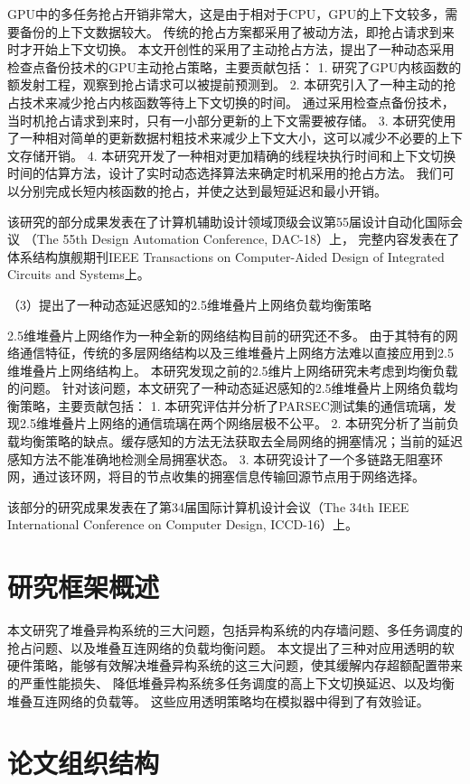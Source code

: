 GPU中的多任务抢占开销非常大，这是由于相对于CPU，GPU的上下文较多，需要备份的上下文数据较大。
传统的抢占方案都采用了被动方法，即抢占请求到来时才开始上下文切换。
本文开创性的采用了主动抢占方法，提出了一种动态采用检查点备份技术的GPU主动抢占策略，主要贡献包括：
1. 研究了GPU内核函数的额发射工程，观察到抢占请求可以被提前预测到。
2. 本研究引入了一种主动的抢占技术来减少抢占内核函数等待上下文切换的时间。
通过采用检查点备份技术，当时机抢占请求到来时，只有一小部分更新的上下文需要被存储。
3. 本研究使用了一种相对简单的更新数据村粗技术来减少上下文大小，这可以减少不必要的上下文存储开销。
4. 本研究开发了一种相对更加精确的线程块执行时间和上下文切换时间的估算方法，设计了实时动态选择算法来确定时机采用的抢占方法。
我们可以分别完成长短内核函数的抢占，并使之达到最短延迟和最小开销。

该研究的部分成果发表在了计算机辅助设计领域顶级会议第55届设计自动化国际会议
（The 55th Design Automation Conference, DAC-18）上，
完整内容发表在了体系结构旗舰期刊IEEE Transactions on Computer-Aided Design of Integrated Circuits and Systems上。 

（3）提出了一种动态延迟感知的2.5维堆叠片上网络负载均衡策略

2.5维堆叠片上网络作为一种全新的网络结构目前的研究还不多。
由于其特有的网络通信特征，传统的多层网络结构以及三维堆叠片上网络方法难以直接应用到2.5维堆叠片上网络结构上。
本研究发现之前的2.5维片上网络研究未考虑到均衡负载的问题。
针对该问题，本文研究了一种动态延迟感知的2.5维堆叠片上网络负载均衡策略，主要贡献包括：
1. 本研究评估并分析了PARSEC测试集的通信琉璃，发现2.5维堆叠片上网络的通信琉璃在两个网络层极不公平。
2. 本研究分析了当前负载均衡策略的缺点。缓存感知的方法无法获取去全局网络的拥塞情况；当前的延迟感知方法不能准确地检测全局拥塞状态。
3. 本研究设计了一个多链路无阻塞环网，通过该环网，将目的节点收集的拥塞信息传输回源节点用于网络选择。

该部分的研究成果发表在了第34届国际计算机设计会议（The 34th IEEE International Conference on Computer Design, ICCD-16）上。

\section{研究框架概述}

本文研究了堆叠异构系统的三大问题，包括异构系统的内存墙问题、多任务调度的抢占问题、以及堆叠互连网络的负载均衡问题。
本文提出了三种对应用透明的软硬件策略，能够有效解决堆叠异构系统的这三大问题，使其缓解内存超额配置带来的严重性能损失、
降低堆叠异构系统多任务调度的高上下文切换延迟、以及均衡堆叠互连网络的负载等。
这些应用透明策略均在模拟器中得到了有效验证。



\section{论文组织结构}

